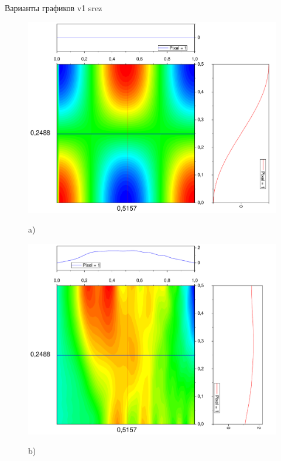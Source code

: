 \documentclass[a4paper,12pt]{article}
\begin{document}
Варианты графиков v1 srez
\begin{figure}[h!]
	\begin{center}
		\begin{minipage}[h]{0.24\linewidth}
			\includegraphics[width=\textwidth]{graphs/graphs_l/v1/wave_t-0_v1_srez} \begin{center}	a)	\end{center}
		\end{minipage}
		\begin{minipage}[h]{0.24\linewidth}
			\includegraphics[width=\textwidth]{graphs/graphs_l/v1/wave_t-8_v1_srez} \begin{center}	b)	\end{center}

\end{minipage}
\end{center}
\end{figure}
\end{document}
